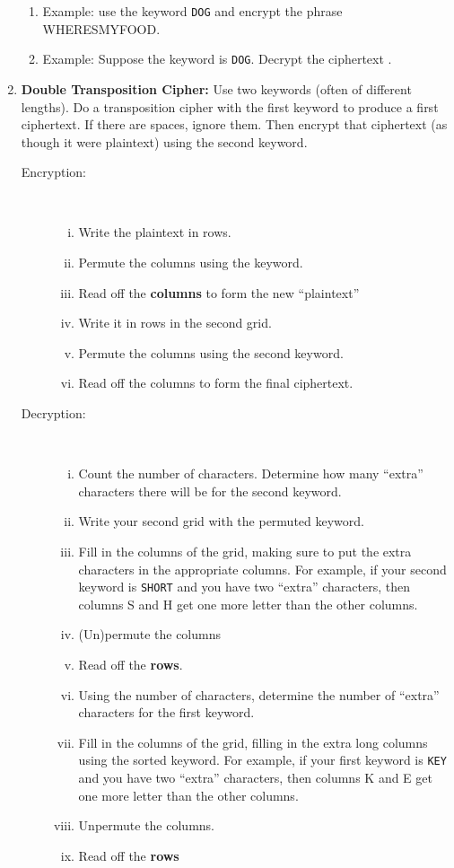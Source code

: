\documentclass[12pt]{article}
\newcommand{\be}{\begin{enumerate}}
\newcommand{\ee}{\end{enumerate}}
\begin{document}
\begin{enumerate}
\be
\item Example: use the keyword {\tt DOG} and encrypt the phrase WHERESMYFOOD.

\vfill

\item Example: Suppose the keyword is {\tt DOG}. Decrypt the ciphertext . 



\vfill

\ee

\newpage
\item{\bf Double Transposition Cipher:} Use two keywords (often of different lengths). Do a transposition cipher with the first keyword to produce a first ciphertext. If there are spaces, ignore them. Then encrypt that ciphertext (as though it were plaintext) using the second keyword.

\begin{description}
\item[Encryption:]\
\be[i.]
\item Write the plaintext in rows.
\item Permute the columns using the keyword.
\item Read off the {\bf columns} to form the new ``plaintext'' 
\item Write it in rows in the second grid.
\item Permute the columns using the second keyword.
\item Read off the columns to form the final ciphertext.
\ee

\item[Decryption:]\
\be[i.]
\item Count the number of characters. Determine how many ``extra'' characters there will be for the second keyword. 
\item Write your second grid with the permuted keyword. 
\item Fill in the columns of the grid, making sure to put the extra characters in the appropriate columns. For example, if your second keyword is {\tt SHORT} and you have two ``extra'' characters, then columns S and H get one more letter than the other columns.
\item (Un)permute the columns
\item Read off the {\bf rows}.
\item Using the number of characters, determine the number of ``extra'' characters for the first keyword.
\item Fill in the columns of the grid, filling in the extra long columns using the sorted keyword. For example, if your first keyword is {\tt KEY} and you have two ``extra'' characters, then columns K and E get one more letter than the other columns.
\item Unpermute the columns.
\item Read off the {\bf rows}
\ee
\end{description}



\end{enumerate}
\end{document}

